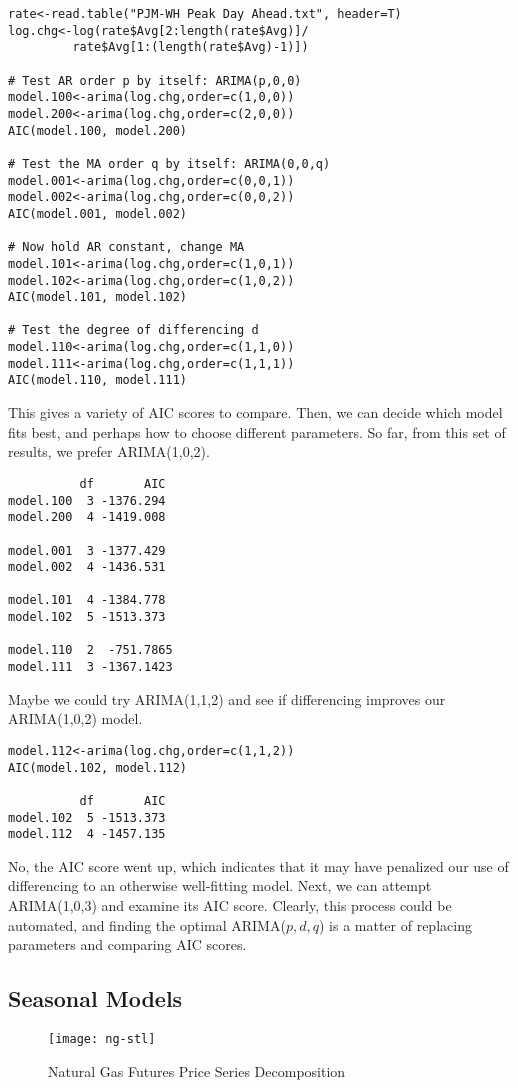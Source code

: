 \begin{verbatim}
rate<-read.table("PJM-WH Peak Day Ahead.txt", header=T)
log.chg<-log(rate$Avg[2:length(rate$Avg)]/
         rate$Avg[1:(length(rate$Avg)-1)])

# Test AR order p by itself: ARIMA(p,0,0)
model.100<-arima(log.chg,order=c(1,0,0))
model.200<-arima(log.chg,order=c(2,0,0))
AIC(model.100, model.200)

# Test the MA order q by itself: ARIMA(0,0,q)
model.001<-arima(log.chg,order=c(0,0,1))
model.002<-arima(log.chg,order=c(0,0,2))
AIC(model.001, model.002)

# Now hold AR constant, change MA
model.101<-arima(log.chg,order=c(1,0,1))
model.102<-arima(log.chg,order=c(1,0,2))
AIC(model.101, model.102)

# Test the degree of differencing d
model.110<-arima(log.chg,order=c(1,1,0))
model.111<-arima(log.chg,order=c(1,1,1))
AIC(model.110, model.111)
\end{verbatim}
This gives a variety of AIC scores to compare. Then, we can decide which model fits best, and perhaps how to choose different parameters. So far, from this set of results, we prefer ARIMA(1,0,2).
\begin{verbatim}
          df       AIC
model.100  3 -1376.294
model.200  4 -1419.008

model.001  3 -1377.429
model.002  4 -1436.531

model.101  4 -1384.778
model.102  5 -1513.373

model.110  2  -751.7865
model.111  3 -1367.1423
\end{verbatim}
Maybe we could try ARIMA(1,1,2) and see if differencing improves our ARIMA(1,0,2) model.
\begin{verbatim}
model.112<-arima(log.chg,order=c(1,1,2))
AIC(model.102, model.112)

          df       AIC
model.102  5 -1513.373
model.112  4 -1457.135
\end{verbatim}
No, the AIC score went up, which indicates that it may have penalized our use of differencing to an otherwise well-fitting model. Next, we can attempt ARIMA(1,0,3) and examine its AIC score. Clearly, this process could be automated, and finding the optimal ARIMA($p,d,q$) is a matter of replacing parameters and comparing AIC scores.

\subsection{Seasonal Models}
\begin{figure}[tb]
  \centering
  \texttt{[image: ng-stl]}
  \caption{Natural Gas Futures Price Series Decomposition}
  \label{figure:ng-stl}
\end{figure}

